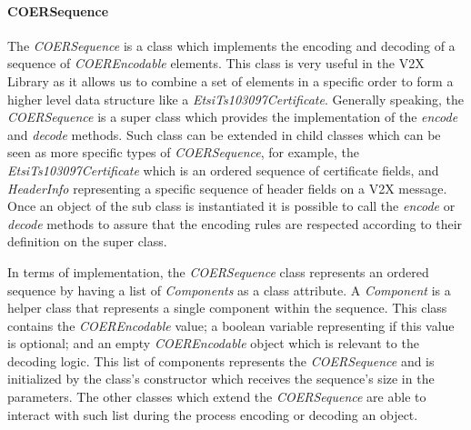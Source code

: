 \paragraph{COERSequence} The \textit{COERSequence} is a class which implements the encoding and decoding of a sequence of \textit{COEREncodable} elements. This class is very useful in the V2X Library as it allows us to combine a set of elements in a specific order to form a higher level data structure like a \textit{EtsiTs103097Certificate}. Generally speaking, the \textit{COERSequence} is a super class which provides the implementation of the \textit{encode} and \textit{decode} methods. Such class can be extended in child classes which can be seen as more specific types of \textit{COERSequence}, for example, the \textit{EtsiTs103097Certificate} which is an ordered sequence of certificate fields, and \textit{HeaderInfo} representing a specific sequence of header fields on a V2X message. Once an object of the sub class is instantiated it is possible to call the \textit{encode} or \textit{decode} methods to assure that the encoding rules are respected according to their definition on the super class. 

In terms of implementation, the \textit{COERSequence} class represents an ordered sequence by having a list of \textit{Components} as a class attribute. A \textit{Component} is a helper class that represents a single component within the sequence. This class contains the \textit{COEREncodable} value; a boolean variable representing if this value is optional; and an empty \textit{COEREncodable} object which is relevant to the decoding logic. This list of components represents the \textit{COERSequence} and is initialized by the class's constructor which receives the sequence's size in the parameters. The other classes which extend the \textit{COERSequence} are able to interact with such list during the process encoding or decoding an object. 

